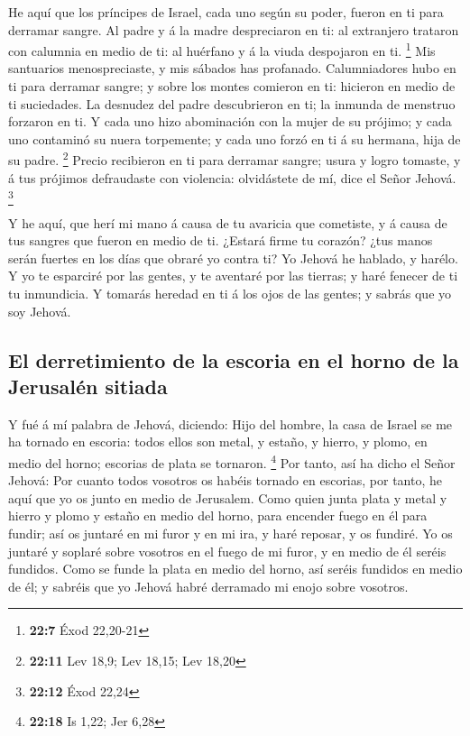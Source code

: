  He aquí que los príncipes de Israel, cada uno según su
poder, fueron en ti para derramar sangre.  Al padre y á la
madre despreciaron en ti: al extranjero trataron con calumnia en medio
de ti: al huérfano y á la viuda despojaron en ti. \footnote{\textbf{22:7}
  Éxod 22,20-21}  Mis santuarios menospreciaste, y mis
sábados has profanado.  Calumniadores hubo en ti para
derramar sangre; y sobre los montes comieron en ti: hicieron en medio de
ti suciedades.  La desnudez del padre descubrieron en ti;
la inmunda de menstruo forzaron en ti.  Y cada uno hizo
abominación con la mujer de su prójimo; y cada uno contaminó su nuera
torpemente; y cada uno forzó en ti á su hermana, hija de su padre.
\footnote{\textbf{22:11} Lev 18,9; Lev 18,15; Lev 18,20} 
Precio recibieron en ti para derramar sangre; usura y logro tomaste, y á
tus prójimos defraudaste con violencia: olvidástete de mí, dice el Señor
Jehová. \footnote{\textbf{22:12} Éxod 22,24}

 Y he aquí, que herí mi mano á causa de tu avaricia que
cometiste, y á causa de tus sangres que fueron en medio de ti.
 ¿Estará firme tu corazón? ¿tus manos serán fuertes en
los días que obraré yo contra ti? Yo Jehová he hablado, y harélo.
 Y yo te esparciré por las gentes, y te aventaré por las
tierras; y haré fenecer de ti tu inmundicia.  Y tomarás
heredad en ti á los ojos de las gentes; y sabrás que yo soy Jehová.

\hypertarget{el-derretimiento-de-la-escoria-en-el-horno-de-la-jerusaluxe9n-sitiada}{%
\subsection{El derretimiento de la escoria en el horno de la Jerusalén
sitiada}\label{el-derretimiento-de-la-escoria-en-el-horno-de-la-jerusaluxe9n-sitiada}}

 Y fué á mí palabra de Jehová, diciendo: 
Hijo del hombre, la casa de Israel se me ha tornado en escoria: todos
ellos son metal, y estaño, y hierro, y plomo, en medio del horno;
escorias de plata se tornaron. \footnote{\textbf{22:18} Is 1,22; Jer
  6,28}  Por tanto, así ha dicho el Señor Jehová: Por
cuanto todos vosotros os habéis tornado en escorias, por tanto, he aquí
que yo os junto en medio de Jerusalem.  Como quien junta
plata y metal y hierro y plomo y estaño en medio del horno, para
encender fuego en él para fundir; así os juntaré en mi furor y en mi
ira, y haré reposar, y os fundiré.  Yo os juntaré y
soplaré sobre vosotros en el fuego de mi furor, y en medio de él seréis
fundidos.  Como se funde la plata en medio del horno, así
seréis fundidos en medio de él; y sabréis que yo Jehová habré derramado
mi enojo sobre vosotros.

